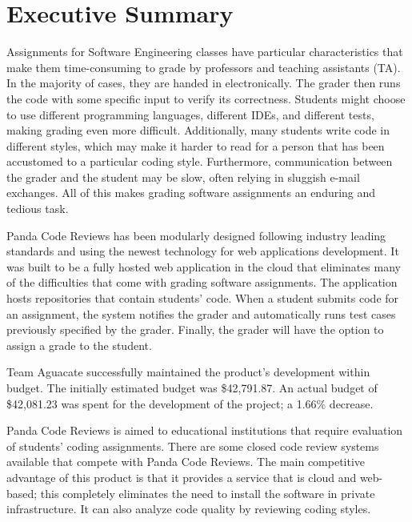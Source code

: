 \part*{Executive Summary}

Assignments for Software Engineering classes have particular characteristics
that make them time-consuming to grade by professors and teaching assistants
(TA). In the majority of cases, they are handed in electronically. The grader
then runs the code with some specific input to verify its correctness. Students
might choose to use different programming languages, different IDEs, and
different tests, making grading even more difficult. Additionally, many students
write code in different styles, which may make it harder to read for a person
that has been accustomed to a particular coding style. Furthermore,
communication between the grader and the student may be slow, often relying in
sluggish e-mail exchanges. All of this makes grading software assignments an
enduring and tedious task.

Panda Code Reviews has been modularly designed following industry leading
standards and using the newest technology for web applications development. It
was built to be a fully hosted web application in the cloud that
eliminates many of the difficulties that come with grading software assignments.
The application hosts repositories that contain students' code. When a
student submits code for an assignment, the system notifies the grader and
automatically runs test cases previously specified by the grader.
Finally, the grader will have the option to assign a
grade to the student.

Team Aguacate successfully maintained the product's development within budget. The initially estimated budget was \$42,791.87. An actual budget of \$42,081.23 was spent for the development of the project; a 1.66\% decrease.

Panda Code Reviews is aimed to educational institutions that require evaluation of students' coding assignments. There are some closed code review systems available that compete with Panda Code Reviews. The main competitive advantage of this product is that it provides a service that is cloud and web-based; this completely eliminates the need to install the software in private infrastructure. It can also analyze code quality by reviewing coding styles.